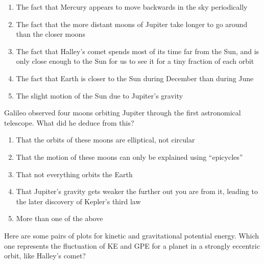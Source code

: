 \documentclass[12pt]{article}
\begin{document}
\begin{enumerate}
\begin{minipage}{\textwidth}
{\begin{enumerate}[label=(\Alph*)]
\setlength\itemsep{0.0em}
\item{ The fact that Mercury appears to move backwards in the sky periodically }
\item{ The fact that the more distant moons of Jupiter take longer to go around than the closer moons }
\item{ The fact that Halley's comet spends most of its time far from the Sun, and is only close enough to the Sun for us to see it for a tiny fraction of each orbit }
\item{ The fact that Earth is closer to the Sun during December than during June }
\item{ The slight motion of the Sun due to Jupiter's gravity }
\end{enumerate}
} %
\end{minipage}


\vspace{0.5in}

\begin{minipage}{\textwidth}
\item{Galileo observed four moons orbiting Jupiter through the first astronomical telescope. What did he deduce from this?

\begin{enumerate}[label=(\Alph*)]
\setlength\itemsep{0.0em}
\item{ That the orbits of these moons are elliptical, not circular }
\item{ That the motion of these moons can only be explained using ``epicycles'' }
\item{ That not everything orbits the Earth }
\item{ That Jupiter's gravity gets weaker the further out you are from it, leading to the later discovery of Kepler's third law }
\item{ More than one of the above }
\end{enumerate}
} %
\end{minipage}


\vspace{0.5in}

\begin{minipage}{\textwidth}
\item{Here are some pairs of plots for kinetic and gravitational potential energy.
Which one represents the fluctuation of KE and GPE for a planet in a
strongly eccentric orbit, like Halley's comet?

}
\end{minipage}
\end{enumerate}
\end{document}
